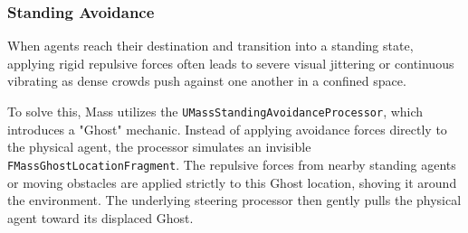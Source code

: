 \subsubsection{Standing Avoidance}

When agents reach their destination and transition into a standing state, applying rigid repulsive forces often leads to severe visual jittering or continuous vibrating as dense crowds push against one another in a confined space.

To solve this, Mass utilizes the \texttt{UMassStandingAvoidanceProcessor}, which introduces a "Ghost" mechanic. Instead of applying avoidance forces directly to the physical agent, the processor simulates an invisible \texttt{FMassGhostLocationFragment}. The repulsive forces from nearby standing agents or moving obstacles are applied strictly to this Ghost location, shoving it around the environment. The underlying steering processor then gently pulls the physical agent toward its displaced Ghost.